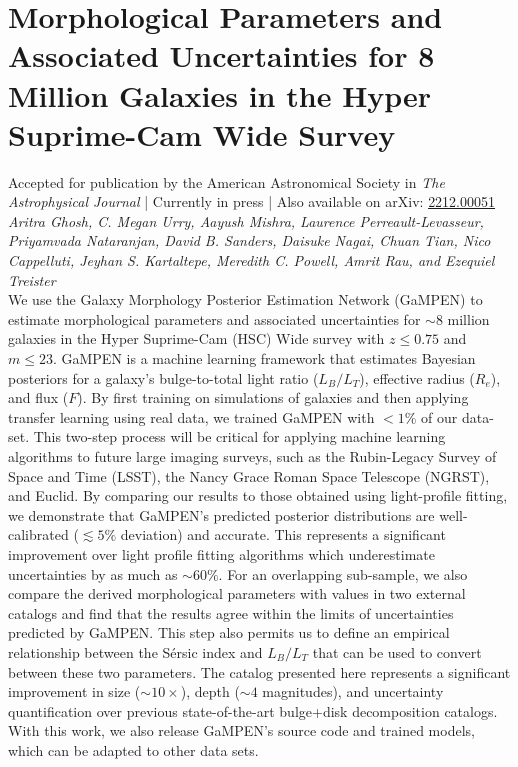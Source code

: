 \chapter{Morphological Parameters and Associated Uncertainties for 8 Million Galaxies in the Hyper Suprime-Cam Wide Survey} \label{chap:hsc_morph}

Accepted for publication by the American Astronomical Society in \textit{The Astrophysical Journal} | Currently in press | Also available on arXiv: \href{https://arxiv.org/abs/2212.00051}{2212.00051}\\
{\large \emph{Aritra Ghosh, C. Megan Urry, Aayush Mishra, Laurence Perreault-Levasseur, Priyamvada Nataranjan, David B. Sanders, Daisuke Nagai, Chuan Tian, Nico Cappelluti, Jeyhan S. Kartaltepe, Meredith C. Powell, Amrit Rau, and Ezequiel Treister}}\\


We use the Galaxy Morphology Posterior Estimation Network (GaMPEN) to estimate morphological parameters and associated uncertainties for $\sim 8$ million galaxies in the Hyper Suprime-Cam (HSC) Wide survey with $z \leq 0.75$ and $m \leq 23$. GaMPEN is a machine learning framework that estimates Bayesian posteriors for a galaxy's bulge-to-total light ratio ($L_B/L_T$), effective radius ($R_e$), and flux ($F$). By first training on simulations of galaxies and then applying transfer learning using real data, we trained GaMPEN with $<1\%$ of our data-set. This two-step process will be critical for applying machine learning algorithms to future large imaging surveys, such as the Rubin-Legacy 
Survey of Space and Time (LSST), the Nancy Grace Roman Space Telescope (NGRST), and Euclid. By comparing our results to those obtained using light-profile fitting, we demonstrate that GaMPEN's predicted posterior distributions are well-calibrated ($\lesssim 5\%$ deviation) and accurate. This represents a significant improvement over light profile fitting algorithms which underestimate uncertainties by as much as $\sim60\%$. For an overlapping sub-sample, we also compare the derived morphological parameters with values in two external catalogs and find that the results agree within the limits of uncertainties predicted by GaMPEN. This step also permits us to define an empirical relationship between the S\'ersic index and $L_B/L_T$ that can be used to convert between these two parameters. The catalog presented here represents a significant improvement in size ($\sim10 \times $), depth ($\sim4$ magnitudes), and uncertainty quantification over previous state-of-the-art bulge+disk decomposition catalogs. With this work, we also release GaMPEN's source code and trained models, which can be adapted to other data sets.


